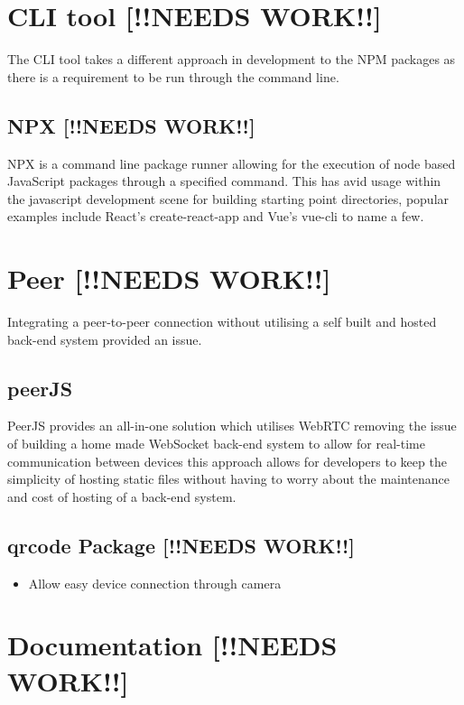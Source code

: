 \documentclass{l4proj}
\begin{document}
\section{CLI tool [!!NEEDS WORK!!]}

The CLI tool takes a different approach in development to the NPM packages as there is a requirement to be run through the command line.

\subsection{NPX [!!NEEDS WORK!!]}
\text NPX is a command line package runner allowing for the execution of node based JavaScript packages through a specified command. This has avid usage within the javascript development scene for building starting point directories, popular examples include React's create-react-app and Vue's vue-cli to name a few.

\section{Peer [!!NEEDS WORK!!]}

Integrating a peer-to-peer connection without utilising a self built and hosted back-end system provided an issue.

\subsection{peerJS}
\text PeerJS provides an all-in-one solution which utilises WebRTC removing the issue of building a home made WebSocket back-end system to allow for real-time communication between devices this approach allows for developers to keep the simplicity of hosting static files without having to worry about the maintenance and cost of hosting of a back-end system.

\subsection{qrcode Package [!!NEEDS WORK!!]}
\begin{itemize}
    \item Allow easy device connection through camera
\end{itemize}

\section{Documentation [!!NEEDS WORK!!]}
\end{document}
